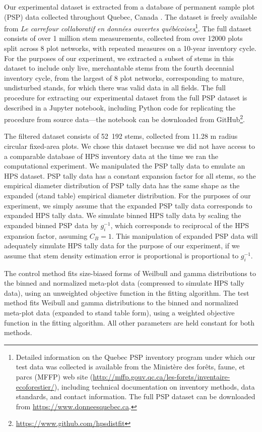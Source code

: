 \documentclass{foresj}
\begin{document}
Our experimental dataset is extracted from a database of permanent sample plot (PSP) data
collected throughout Quebec, Canada \citep{quebec2018pep}.
The dataset is freely available from \emph{Le carrefour
  collaboratif en données ouvertes québécoises}\footnote{Detailed
  information on the Quebec
  PSP inventory program under which our test data was collected is
  available from the Ministère des forêts, faune, et parcs (MFFP) web site
  (\url{http://mffp.gouv.qc.ca/les-forets/inventaire-ecoforestier/}), including
  technical documentation on inventory methods, data standards, and
  contact information. The full PSP dataset can be downloaded from \url{https://www.donneesquebec.ca}.}.
The full dataset consists of over 1 million stem measurements,
collected from over 12000 plots split across 8 plot networks, with
repeated measures on a 10-year inventory cycle.
For the purposes of our experiment, we extracted a subset of stems in this dataset to
include only live, merchantable stems from the fourth decennial inventory
cycle, from the largest of 8 plot networks, corresponding to mature, undisturbed stands, for which there was valid
data in all fields.
The full procedure for extracting our experimental dataset from the
full PSP dataset is described in a Jupyter notebook, including Python
code for replicating the procedure from
source data---the notebook can be downloaded from GitHub\footnote{\url{https://www.github.com/hpsdistfit}}.

The filtered dataset consists of 52~192 stems, collected from 11.28 m
radius circular fixed-area plots.
We chose this dataset because we did not have access to a comparable
database of HPS inventory data at the time we ran the computational
experiment. We manipulated the PSP tally data to emulate an HPS dataset.
PSP tally data has a constant expansion factor for all stems, so the empirical diameter distribution of PSP tally data has the same shape as the expanded (stand table) empirical diameter distribution. 
For the purposes of our experiment, we simply assume that the expanded PSP tally data corresponds to expanded HPS tally data. 
We simulate binned HPS tally data by scaling the expanded binned PSP data by $g_i^{-1}$, which corresponds to reciprocal of the HPS expansion factor, assuming $C_B = 1$. 
This manipulation of expanded PSP data will adequately simulate HPS
tally data for the purpose of our experiment, if we assume that stem density estimation error is proportional is proportional to $g_i^{-1}$.

The control method fits size-biased forms of Weilbull and gamma
distributions to the binned and normalized meta-plot data (compressed to simulate HPS tally data), using an unweighted objective function in the fitting algorithm.
The test method fits Weibull and gamma distributions to the binned and
normalized meta-plot data (expanded to stand table form), using a weighted objective function in the fitting algorithm.
All other parameters are held constant for both methods.
\end{document}

